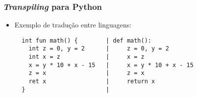 \documentclass{beamer}
\begin{document}
\begin{frame}[fragile]
    \frametitle{\emph{Transpiling} para Python}

    \begin{itemize}
        \item Exemplo de tradução entre linguagens:

        \begin{verbatim}
  int fun math() {        | def math():
    int z = 0, y = 2      |     z = 0, y = 2
    int x = z             |     x = z
    x = y * 10 + x - 15   |     x = y * 10 + x - 15
    z = x                 |     z = x
    ret x                 |     return x
  }                       |
        \end{verbatim}
    \end{itemize}
\end{frame}
\end{document}
